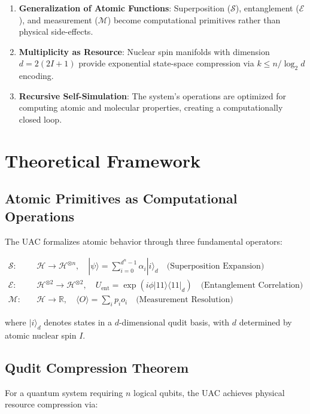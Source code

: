 \documentclass[12pt, a4paper]{article}
\begin{document}
\begin{enumerate}
    \item \textbf{Generalization of Atomic Functions}: Superposition ($\mathcal{S}$), entanglement ($\mathcal{E}$), and measurement ($\mathcal{M}$) become computational primitives rather than physical side-effects.
    \item \textbf{Multiplicity as Resource}: Nuclear spin manifolds with dimension $d = 2(2I+1)$ provide exponential state-space compression via $k \leq n/\log_2 d$ encoding.
    \item \textbf{Recursive Self-Simulation}: The system's operations are optimized for computing atomic and molecular properties, creating a computationally closed loop.
\end{enumerate}

\section{Theoretical Framework}
\label{sec:theoretical}

\subsection{Atomic Primitives as Computational Operations}
The UAC formalizes atomic behavior through three fundamental operators:

\begin{align}
    \mathcal{S}: & \quad \mathcal{H} \rightarrow \mathcal{H}^{\otimes n}, \quad |\psi\rangle = \sum_{i=0}^{d^n-1} \alpha_i |i\rangle_d \quad \text{(Superposition Expansion)} \\
    \mathcal{E}: & \quad \mathcal{H}^{\otimes 2} \rightarrow \mathcal{H}^{\otimes 2}, \quad U_{\text{ent}} = \exp(i\phi |11\rangle\langle 11|_d) \quad \text{(Entanglement Correlation)} \\
    \mathcal{M}: & \quad \mathcal{H} \rightarrow \mathbb{R}, \quad \langle O \rangle = \sum_{i} p_i o_i \quad \text{(Measurement Resolution)}
\end{align}

where $|i\rangle_d$ denotes states in a $d$-dimensional qudit basis, with $d$ determined by atomic nuclear spin $I$.

\subsection{Qudit Compression Theorem}
For a quantum system requiring $n$ logical qubits, the UAC achieves physical resource compression via:
\end{document}
